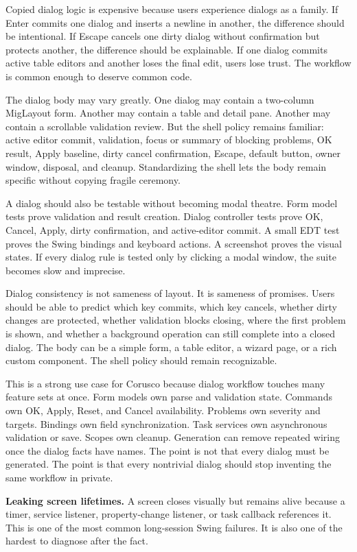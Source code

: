 Copied dialog logic is expensive because users experience dialogs as a family.
If Enter commits one dialog and inserts a newline in another, the difference
should be intentional. If Escape cancels one dirty dialog without confirmation
but protects another, the difference should be explainable. If one dialog
commits active table editors and another loses the final edit, users lose trust.
The workflow is common enough to deserve common code.

The dialog body may vary greatly. One dialog may contain a two-column MigLayout
form. Another may contain a table and detail pane. Another may contain a
scrollable validation review. But the shell policy remains familiar: active
editor commit, validation, focus or summary of blocking problems, OK result,
Apply baseline, dirty cancel confirmation, Escape, default button, owner
window, disposal, and cleanup. Standardizing the shell lets the body remain
specific without copying fragile ceremony.

A dialog should also be testable without becoming modal theatre. Form model
tests prove validation and result creation. Dialog controller tests prove OK,
Cancel, Apply, dirty confirmation, and active-editor commit. A small EDT test
proves the Swing bindings and keyboard actions. A screenshot proves the visual
states. If every dialog rule is tested only by clicking a modal window, the
suite becomes slow and imprecise.

Dialog consistency is not sameness of layout. It is sameness of promises.
Users should be able to predict which key commits, which key cancels, whether
dirty changes are protected, whether validation blocks closing, where the first
problem is shown, and whether a background operation can still complete into a
closed dialog. The body can be a simple form, a table editor, a wizard page, or
a rich custom component. The shell policy should remain recognizable.

This is a strong use case for Corusco because dialog workflow touches many
feature sets at once. Form models own parse and validation state. Commands own
OK, Apply, Reset, and Cancel availability. Problems own severity and targets.
Bindings own field synchronization. Task services own asynchronous validation
or save. Scopes own cleanup. Generation can remove repeated wiring once the
dialog facts have names. The point is not that every dialog must be generated.
The point is that every nontrivial dialog should stop inventing the same
workflow in private.

\textbf{Leaking screen lifetimes.}
A screen closes visually but remains alive because a timer, service listener, property-change listener, or task callback references it. This is one of the most common long-session Swing failures. It is also one of the hardest to diagnose after the fact.

